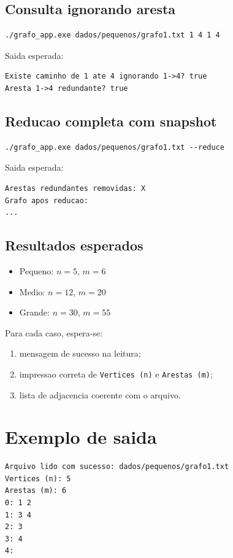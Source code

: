 \documentclass[12pt,a4paper]{article}
\begin{document}
\subsection{Consulta ignorando aresta}
\begin{lstlisting}[style=cppstyle]
./grafo_app.exe dados/pequenos/grafo1.txt 1 4 1 4
\end{lstlisting}

Saida esperada:
\begin{verbatim}
Existe caminho de 1 ate 4 ignorando 1->4? true
Aresta 1->4 redundante? true
\end{verbatim}

\subsection{Reducao completa com snapshot}
\begin{lstlisting}[style=cppstyle]
./grafo_app.exe dados/pequenos/grafo1.txt --reduce
\end{lstlisting}

Saida esperada:
\begin{verbatim}
Arestas redundantes removidas: X
Grafo apos reducao:
...
\end{verbatim}

\subsection{Resultados esperados}
\begin{itemize}
    \item Pequeno: $n=5$, $m=6$
    \item Medio: $n=12$, $m=20$
    \item Grande: $n=30$, $m=55$
\end{itemize}

Para cada caso, espera-se:
\begin{enumerate}
    \item mensagem de sucesso na leitura;
    \item impressao correta de \texttt{Vertices (n)} e \texttt{Arestas (m)};
    \item lista de adjacencia coerente com o arquivo.
\end{enumerate}

\section{Exemplo de saida}
\begin{verbatim}
Arquivo lido com sucesso: dados/pequenos/grafo1.txt
Vertices (n): 5
Arestas (m): 6
0: 1 2
1: 3 4
2: 3
3: 4
4:
\end{verbatim}
\end{document}
